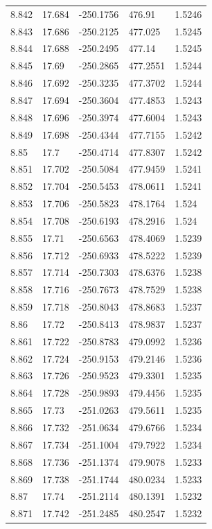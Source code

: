 \begin{tabular}{lllll}
8.842 & 17.684 & -250.1756 & 476.91 & 1.5246 \\
8.843 & 17.686 & -250.2125 & 477.025 & 1.5245 \\
8.844 & 17.688 & -250.2495 & 477.14 & 1.5245 \\
8.845 & 17.69 & -250.2865 & 477.2551 & 1.5244 \\
8.846 & 17.692 & -250.3235 & 477.3702 & 1.5244 \\
8.847 & 17.694 & -250.3604 & 477.4853 & 1.5243 \\
8.848 & 17.696 & -250.3974 & 477.6004 & 1.5243 \\
8.849 & 17.698 & -250.4344 & 477.7155 & 1.5242 \\
8.85 & 17.7 & -250.4714 & 477.8307 & 1.5242 \\
8.851 & 17.702 & -250.5084 & 477.9459 & 1.5241 \\
8.852 & 17.704 & -250.5453 & 478.0611 & 1.5241 \\
8.853 & 17.706 & -250.5823 & 478.1764 & 1.524 \\
8.854 & 17.708 & -250.6193 & 478.2916 & 1.524 \\
8.855 & 17.71 & -250.6563 & 478.4069 & 1.5239 \\
8.856 & 17.712 & -250.6933 & 478.5222 & 1.5239 \\
8.857 & 17.714 & -250.7303 & 478.6376 & 1.5238 \\
8.858 & 17.716 & -250.7673 & 478.7529 & 1.5238 \\
8.859 & 17.718 & -250.8043 & 478.8683 & 1.5237 \\
8.86 & 17.72 & -250.8413 & 478.9837 & 1.5237 \\
8.861 & 17.722 & -250.8783 & 479.0992 & 1.5236 \\
8.862 & 17.724 & -250.9153 & 479.2146 & 1.5236 \\
8.863 & 17.726 & -250.9523 & 479.3301 & 1.5235 \\
8.864 & 17.728 & -250.9893 & 479.4456 & 1.5235 \\
8.865 & 17.73 & -251.0263 & 479.5611 & 1.5235 \\
8.866 & 17.732 & -251.0634 & 479.6766 & 1.5234 \\
8.867 & 17.734 & -251.1004 & 479.7922 & 1.5234 \\
8.868 & 17.736 & -251.1374 & 479.9078 & 1.5233 \\
8.869 & 17.738 & -251.1744 & 480.0234 & 1.5233 \\
8.87 & 17.74 & -251.2114 & 480.1391 & 1.5232 \\
8.871 & 17.742 & -251.2485 & 480.2547 & 1.5232 \\

\end{tabular}
